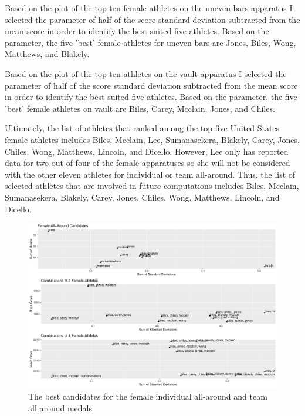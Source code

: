 \documentclass[12pt]{article}
\begin{document}
Based on the plot of the top ten female athletes on the uneven bars apparatus I selected the parameter of 
half of the score standard deviation subtracted from the mean score in order to identify the best suited five 
athletes. Based on the parameter, the five 'best' female athletes for uneven bars are Jones, Biles, Wong, 
Matthews, and Blakely.



Based on the plot of the top ten athletes on the vault apparatus I selected the parameter of 
half of the score standard deviation subtracted from the mean score in order to identify the best suited five 
athletes. Based on the parameter, the five 'best' female athletes on vault are Biles, Carey, Mcclain, Jones, 
and Chiles.

Ultimately, the list of athletes that ranked among the top five United States female athletes includes Biles, 
Mcclain, Lee, Sumanasekera, Blakely, Carey, Jones, Chiles, Wong, Matthews, Lincoln, and Dicello. However, Lee 
only has reported data for two out of four of the female apparatuses so she will not be considered with the other 
eleven athletes for individual or team all-around. Thus, the list of selected athletes that are involved in future 
computations includes Biles, Mcclain, Sumanasekera, Blakely, Carey, Jones, Chiles, Wong, Matthews, Lincoln, 
and Dicello.

\begin{figure}
  \centering
  \includegraphics[scale=0.55]{FemaleMultipleAllAround.pdf}
  \caption{The best candidates for the female individual all-around and team all around medals}
  \label{fig:FAA}
\end{figure}
\end{document}
